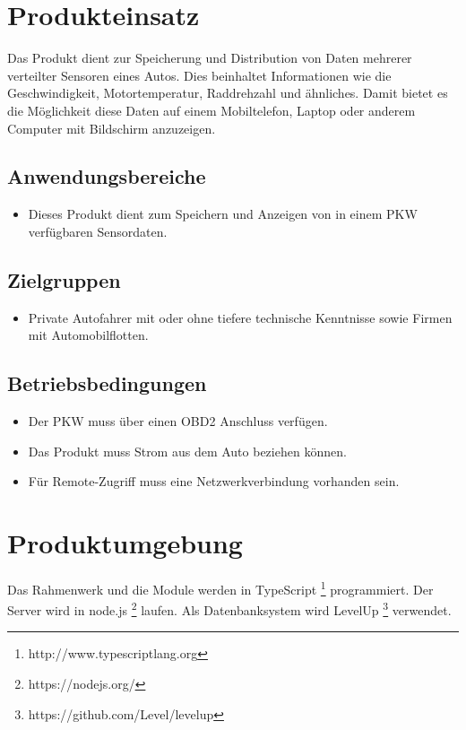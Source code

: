 \documentclass[pflichtenheft.tex]{subfiles}
\begin{document}
\chapter{Produkteinsatz}
Das Produkt dient zur Speicherung und Distribution von Daten mehrerer verteilter Sensoren eines Autos. Dies beinhaltet Informationen wie die Geschwindigkeit, Motortemperatur, Raddrehzahl und ähnliches. Damit bietet es die Möglichkeit diese Daten  auf einem Mobiltelefon, Laptop oder anderem Computer mit Bildschirm anzuzeigen.


\section{Anwendungsbereiche}
\begin{itemize}
\item
Dieses Produkt dient zum Speichern und Anzeigen von in einem PKW verfügbaren Sensordaten.
\end{itemize}


\section{Zielgruppen}
\begin{itemize}
\item
Private Autofahrer mit oder ohne tiefere technische Kenntnisse sowie Firmen mit Automobilflotten. 
\end{itemize}


\section{Betriebsbedingungen}
\begin{itemize}
\item
Der PKW muss über einen OBD2 Anschluss verfügen.
\item
Das Produkt muss Strom aus dem Auto beziehen können.
\item
Für Remote-Zugriff muss eine Netzwerkverbindung vorhanden sein.
\end{itemize}


\chapter{Produktumgebung}
Das Rahmenwerk und die Module werden in TypeScript \footnote{http://www.typescriptlang.org} programmiert. Der Server wird in node.js \footnote{https://nodejs.org/} laufen. Als Datenbanksystem wird LevelUp \footnote{https://github.com/Level/levelup} verwendet.
\end{document}

